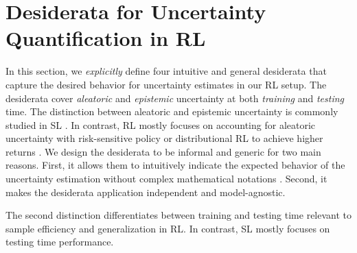 \vspace{-3mm}
\section{Desiderata for Uncertainty Quantification in RL}
\label{sec:desiderata_011}

In this section, we \emph{explicitly} define four intuitive and general desiderata that capture the desired behavior for uncertainty estimates in our RL setup. The desiderata cover \emph{aleatoric} and \emph{epistemic} uncertainty at both \emph{training} and \emph{testing} time. The distinction between aleatoric and epistemic uncertainty is commonly studied in SL \citep{uncertainty-deep-learning, PriorNetworks, natpn}. In contrast, RL mostly focuses on accounting for aleatoric uncertainty with risk-sensitive policy or distributional RL to achieve higher returns \citep{distributional-rl-prespective, distributional-rl, iqn}. We design the desiderata to be informal and generic for two main reasons. First, it allows them to intuitively indicate the expected behavior of the uncertainty estimation without complex mathematical notations \citep{graph-postnet,Eswaran2017}. Second, it makes the desiderata application independent and model-agnostic.

The second distinction differentiates between training and testing time relevant to sample efficiency and generalization in RL. In contrast, SL mostly focuses on testing time performance.


